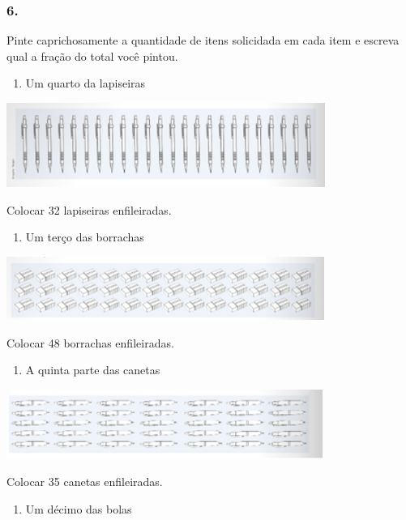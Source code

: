 \subsubsection{6. }\label{section-109}

Pinte caprichosamente a quantidade de itens solicidada em cada item e
escreva qual a fração do total você pintou.

\begin{enumerate}
\def\labelenumi{\alph{enumi})}
\item
  Um quarto da lapiseiras
\end{enumerate}

\includegraphics[width=4.09202in,height=1.08343in]{media/image111.png}

Colocar 32 lapiseiras enfileiradas.

\begin{enumerate}
\def\labelenumi{\alph{enumi})}
\item
  Um terço das borrachas
\end{enumerate}

\includegraphics[width=4.08369in,height=0.81674in]{media/image112.png}

Colocar 48 borrachas enfileiradas.

\begin{enumerate}
\def\labelenumi{\alph{enumi})}
\item
  A quinta parte das canetas
\end{enumerate}

\includegraphics[width=4.06702in,height=0.89174in]{media/image113.png}

Colocar 35 canetas enfileiradas.

\begin{enumerate}
\def\labelenumi{\alph{enumi})}
\item
  Um décimo das bolas
\end{enumerate}

